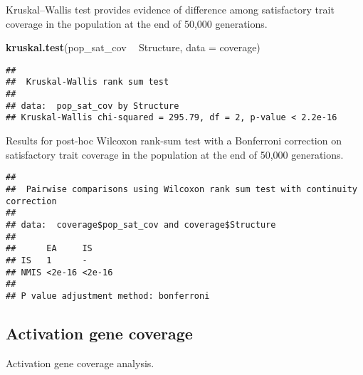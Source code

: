 \documentclass[]{book}
\newenvironment{Shaded}{\begin{snugshade}}{\end{snugshade}}
\newcommand{\DataTypeTok}[1]{\textcolor[rgb]{0.13,0.29,0.53}{#1}}
\newcommand{\KeywordTok}[1]{\textcolor[rgb]{0.13,0.29,0.53}{\textbf{#1}}}
\newcommand{\NormalTok}[1]{#1}
\newcommand{\OperatorTok}[1]{\textcolor[rgb]{0.81,0.36,0.00}{\textbf{#1}}}
\newcommand{\OtherTok}[1]{\textcolor[rgb]{0.56,0.35,0.01}{#1}}
\newcommand{\StringTok}[1]{\textcolor[rgb]{0.31,0.60,0.02}{#1}}
\begin{document}
Kruskal--Wallis test provides evidence of difference among satisfactory trait coverage in the population at the end of 50,000 generations.

\begin{Shaded}
\begin{Highlighting}[]
\KeywordTok{kruskal.test}\NormalTok{(pop_sat_cov }\OperatorTok{~}\StringTok{ }\NormalTok{Structure, }\DataTypeTok{data =}\NormalTok{ coverage)}
\end{Highlighting}
\end{Shaded}

\begin{verbatim}
## 
##  Kruskal-Wallis rank sum test
## 
## data:  pop_sat_cov by Structure
## Kruskal-Wallis chi-squared = 295.79, df = 2, p-value < 2.2e-16
\end{verbatim}

Results for post-hoc Wilcoxon rank-sum test with a Bonferroni correction on satisfactory trait coverage in the population at the end of 50,000 generations.

\begin{Shaded}
\end{Shaded}

\begin{verbatim}
## 
##  Pairwise comparisons using Wilcoxon rank sum test with continuity correction 
## 
## data:  coverage$pop_sat_cov and coverage$Structure 
## 
##      EA     IS    
## IS   1      -     
## NMIS <2e-16 <2e-16
## 
## P value adjustment method: bonferroni
\end{verbatim}

\hypertarget{activation-gene-coverage-7}{%
\subsection{Activation gene coverage}\label{activation-gene-coverage-7}}

Activation gene coverage analysis.
\end{document}
